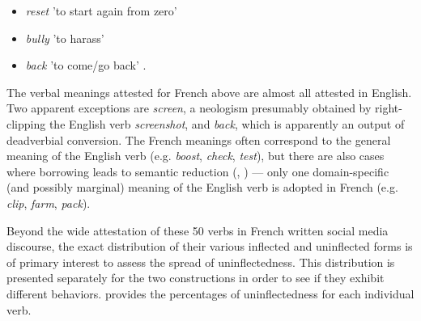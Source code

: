 \documentclass[output=paper]{langscibook}
\begin{document}
\begin{itemize}
\item \begin{styleListParagraph}
\textit{reset} 'to start again from zero' 
\end{styleListParagraph}
\item \begin{styleListParagraph}
\textit{bully} 'to harass' 
\end{styleListParagraph}
\item \begin{styleListParagraph}
\textit{back} {}'to come/go back' .
\end{styleListParagraph}
\end{itemize}

The verbal meanings attested for French above are almost all attested in English. Two apparent exceptions are \textit{screen}, a neologism presumably obtained by right-clipping the English verb \textit{screenshot}, and \textit{back}, which is apparently an output of deadverbial conversion. The French meanings often correspond to the general meaning of the English verb (e.g. \textit{boost}, \textit{check}, \textit{test}), but there are also cases where borrowing leads to semantic reduction (\citealt{Alexieva2008}, \citealt{Winter-Froemel2019}) — only one domain-specific (and possibly marginal) meaning of the English verb is adopted in French (e.g. \textit{clip}, \textit{farm}, \textit{pack}). 

Beyond the wide attestation of these 50 verbs in French written social media discourse, the exact distribution of their various inflected and uninflected forms is of primary interest to assess the spread of uninflectedness. This distribution is presented separately for the two constructions in order to see if they exhibit different behaviors.  provides the percentages of uninflectedness for each individual verb.
\end{document}
